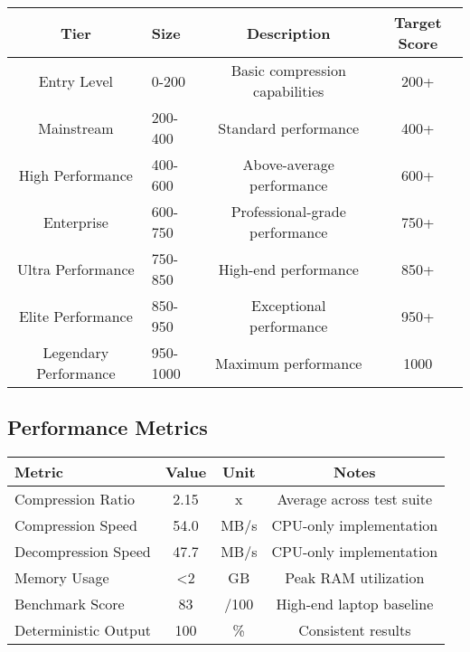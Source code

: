 \documentclass[12pt,a4paper]{article}
\begin{document}
\begin{center}
\begin{tabular}{|c|l|c|c|}
\hline
\textbf{Tier} & \textbf{Size} & \textbf{Description} & \textbf{Target Score} \\
\hline
Entry Level & 0-200 & Basic compression capabilities & 200+ \\
Mainstream & 200-400 & Standard performance & 400+ \\
High Performance & 400-600 & Above-average performance & 600+ \\
Enterprise & 600-750 & Professional-grade performance & 750+ \\
Ultra Performance & 750-850 & High-end performance & 850+ \\
Elite Performance & 850-950 & Exceptional performance & 950+ \\
Legendary Performance & 950-1000 & Maximum performance & 1000 \\
\hline
\end{tabular}
\end{center}

\subsection{Performance Metrics}
\begin{center}
\begin{tabular}{|l|c|c|c|}
\hline
\textbf{Metric} & \textbf{Value} & \textbf{Unit} & \textbf{Notes} \\
\hline
Compression Ratio & 2.15 & x & Average across test suite \\
Compression Speed & 54.0 & MB/s & CPU-only implementation \\
Decompression Speed & 47.7 & MB/s & CPU-only implementation \\
Memory Usage & <2 & GB & Peak RAM utilization \\
Benchmark Score & 83 & /100 & High-end laptop baseline \\
Deterministic Output & 100 & \% & Consistent results \\
\hline
\end{tabular}
\end{center}
\end{document}
